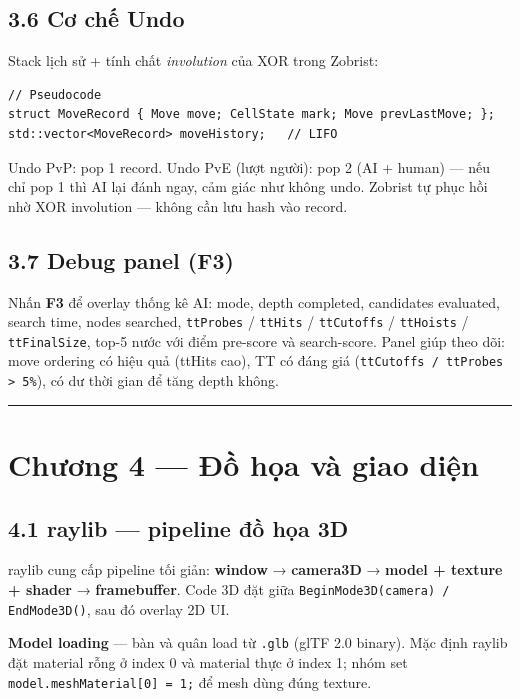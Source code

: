 \documentclass[11pt,a4paper]{article}
\begin{document}
\subsection{3.6 Cơ chế Undo}
\label{sec:org04f2ed6}

Stack lịch sử + tính chất \emph{involution} của XOR trong Zobrist:

\begin{verbatim}
// Pseudocode
struct MoveRecord { Move move; CellState mark; Move prevLastMove; };
std::vector<MoveRecord> moveHistory;   // LIFO
\end{verbatim}

Undo PvP: pop 1 record. Undo PvE (lượt người): pop 2 (AI + human) — nếu chỉ pop 1 thì AI lại đánh ngay, cảm giác như không undo. Zobrist tự phục hồi nhờ XOR involution — không cần lưu hash vào record.
\subsection{3.7 Debug panel (F3)}
\label{sec:org8a68edd}

Nhấn \textbf{F3} để overlay thống kê AI: mode, depth completed, candidates evaluated, search time, nodes searched, \texttt{ttProbes} / \texttt{ttHits} / \texttt{ttCutoffs} / \texttt{ttHoists} / \texttt{ttFinalSize}, top-5 nước với điểm pre-score và search-score. Panel giúp theo dõi: move ordering có hiệu quả (ttHits cao), TT có đáng giá (\texttt{ttCutoffs / ttProbes > 5\%}), có dư thời gian để tăng depth không.

\noindent\rule{\textwidth}{0.5pt}
\section{Chương 4 — Đồ họa và giao diện}
\label{sec:org70a73fc}

\subsection{4.1 raylib — pipeline đồ họa 3D}
\label{sec:org68618f7}

raylib cung cấp pipeline tối giản: \textbf{window} → \textbf{camera3D} → \textbf{model + texture + shader} → \textbf{framebuffer}. Code 3D đặt giữa \texttt{BeginMode3D(camera) / EndMode3D()}, sau đó overlay 2D UI.

\textbf{Model loading} — bàn và quân load từ \texttt{.glb} (glTF 2.0 binary). Mặc định raylib đặt material rỗng ở index 0 và material thực ở index 1; nhóm set \texttt{model.meshMaterial[0] = 1;} để mesh dùng đúng texture.
\end{document}
